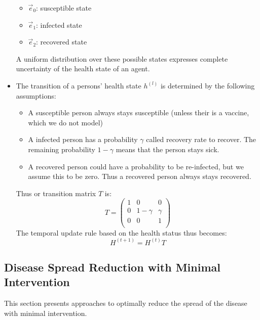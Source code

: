 \documentclass[]{article}
\begin{document}
\begin{itemize}
	\begin{itemize}
		\item $\vec{e}_0$: susceptible state
		\item $\vec{e}_1$: infected state
		\item $\vec{e}_2$: recovered state
	\end{itemize}
	A uniform distribution over these possible states expresses complete uncertainty of the health state of an agent.
	\item The transition of a persons' health state $h^{(l)}$ is determined by the following assumptions:
	\begin{itemize}
		\item A susceptible person always stays susceptible (unless their is a vaccine, which we do not model)
		\item A infected person has a probability $\gamma$ called recovery rate to recover. The remaining probability $1-\gamma$ means that the person stays sick.
		\item A recovered person could have a probability to be re-infected, but we assume this to be zero. Thus a recovered person always stays recovered.
	\end{itemize}
	Thus or transition matrix $T$ is:
	\begin{equation}
		T = 
		\begin{pmatrix}
			1 &     0    & 0      \\
			0 & 1-\gamma & \gamma \\
			0 &     0    & 1      \\
		\end{pmatrix}
	\end{equation}
	The temporal update rule based on the health status thus becomes:
	\begin{equation}
		H^{(t+1)} = H^{(t)} T
	\end{equation}
\end{itemize}

\subsection{Disease Spread Reduction with Minimal Intervention}
This section presents approaches to optimally reduce the spread of the disease with minimal intervention.
\end{document}
